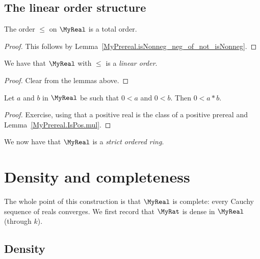 \subsection{The linear order structure}

\begin{lemma}
    \label{MyReal.le_total}
    \leanok
    The order $\leq$ on $\MyReal$ is a total order.
\end{lemma}
\begin{proof}
    \leanok
This follows by Lemma~\ref{MyPrereal.isNonneg_neg_of_not_isNonneg}.
\end{proof}

\begin{lemma}
    \label{MyReal.linearOrder}
    \leanok
    We have that $\MyReal$ with $\leq$ is a \emph{linear order}.
\end{lemma}
\begin{proof}
    \leanok
    Clear from the lemmas above.
\end{proof}

\begin{lemma}
    \label{MyReal.mul_pos}
    \leanok
    Let $a$ and $b$ in $\MyReal$ be such that $0 < a$ and $0 < b$. Then $0 < a * b$.
\end{lemma}
\begin{proof}
    \leanok
Exercise, using that a positive real is the class of a positive prereal and
Lemma~\ref{MyPrereal.IsPos.mul}.
\end{proof}

We now have that $\MyReal$ is a \emph{strict ordered ring}.

\section{Density and completeness}

The whole point of this construction is that $\MyReal$ is complete: every Cauchy sequence of reals
converges. We first record that $\MyRat$ is dense in $\MyReal$ (through $k$).

\subsection{Density}


